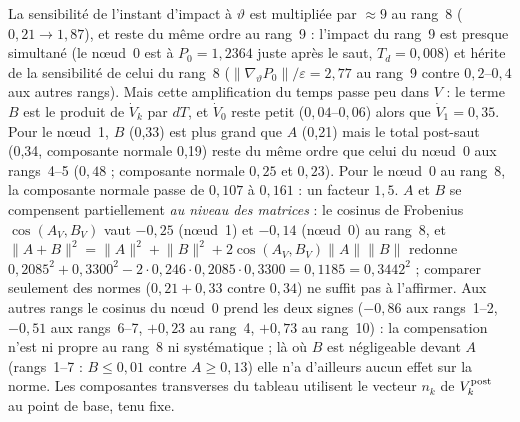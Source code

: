 \documentclass[11pt,a4paper]{article}
\theoremstyle{remark}
\newcommand{\vth}{\vartheta}
\begin{document}
La sensibilit\'e de l'instant d'impact \`a $\vth$ est multipli\'ee par $\approx9$ au rang~8 ($0{,}21\to1{,}87$), et reste du m\^eme ordre au rang~9 : l'impact du rang~9 est presque simultan\'e (le n\oe ud~0 est \`a $P_0=1{,}2364$ juste apr\`es le saut, $T_d=0{,}008$) et h\'erite de la sensibilit\'e de celui du rang~8 ($\lVert\nabla_\vth P_0\rVert/\varepsilon=2{,}77$ au rang~9 contre $0{,}2$--$0{,}4$ aux autres rangs). Mais cette amplification du temps passe peu dans $V$ : le terme $B$ est le produit de $\dot V_k$ par $dT$, et $\dot V_0$ reste petit ($0{,}04$--$0{,}06$) alors que $\dot V_1=0{,}35$. Pour le n\oe ud~1, $B$ (0,33) est plus grand que $A$ (0,21) mais le total post-saut (0,34, composante normale 0,19) reste du m\^eme ordre que celui du n\oe ud~0 aux rangs~4--5 ($0{,}48$ ; composante normale $0{,}25$ et $0{,}23$). Pour le n\oe ud~0 au rang~8, la composante normale passe de $0{,}107$ \`a $0{,}161$ : un facteur $1{,}5$. $A$ et $B$ se compensent partiellement \emph{au niveau des matrices} : le cosinus de Frobenius $\cos(A_V,B_V)$ vaut $-0{,}25$ (n\oe ud~1) et $-0{,}14$ (n\oe ud~0) au rang~8, et $\lVert A+B\rVert^2=\lVert A\rVert^2+\lVert B\rVert^2+2\cos(A_V,B_V)\lVert A\rVert\lVert B\rVert$ redonne $0{,}2085^2+0{,}3300^2-2\cdot0{,}246\cdot0{,}2085\cdot0{,}3300=0{,}1185=0{,}3442^2$ ; comparer seulement des normes ($0{,}21+0{,}33$ contre $0{,}34$) ne suffit pas \`a l'affirmer. Aux autres rangs le cosinus du n\oe ud~0 prend les deux signes ($-0{,}86$ aux rangs~1--2, $-0{,}51$ aux rangs~6--7, $+0{,}23$ au rang~4, $+0{,}73$ au rang~10) : la compensation n'est ni propre au rang~8 ni syst\'ematique ; l\`a o\`u $B$ est n\'egligeable devant $A$ (rangs~1--7 : $B\le0{,}01$ contre $A\ge0{,}13$) elle n'a d'ailleurs aucun effet sur la norme. Les composantes transverses du tableau utilisent le vecteur $n_k$ de $V_k^{\rm post}$ au point de base, tenu fixe.
\end{document}
